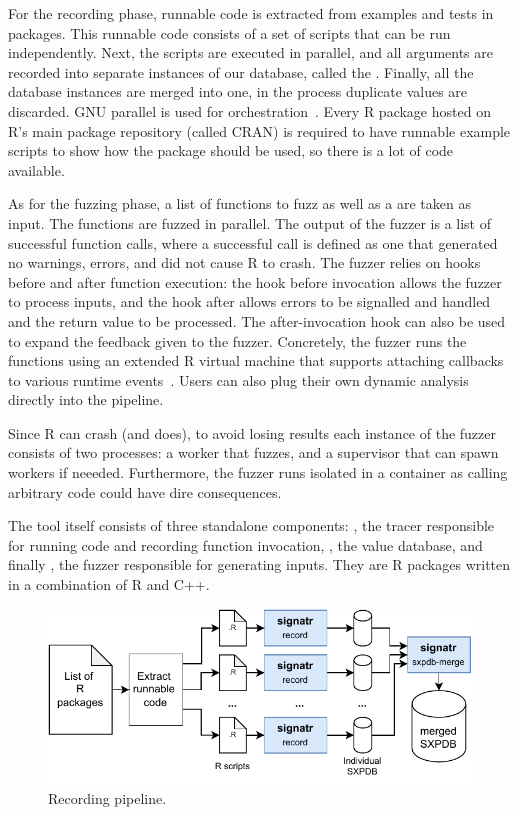 \documentclass[sigplan,nonacm,anonymous,review]{acmart}
\begin{document}
For the recording phase, runnable code is extracted from examples and tests in packages.  
This runnable code consists of a set of scripts
that can be run independently. Next, the scripts are
executed in parallel, and all arguments are recorded into separate instances of
our database, called the \sxpdb.  Finally, all the database instances
are merged into one, in the process duplicate values are discarded. 
GNU parallel is used for orchestration~\cite{tange2011_parallel}.
Every R package hosted on R's main package repository (called CRAN) 
is required to have runnable example scripts to show how the package 
should be used, so there is a lot of code available.

As for the fuzzing phase, a list of functions to fuzz as well as a
\sxpdb are taken as input. The functions are fuzzed in parallel.  The
output of the fuzzer is a list of successful function calls, where a
successful call is defined as one that generated no warnings, errors,
and did not cause R to crash.  The fuzzer relies on hooks before and
after function execution: the hook before invocation allows the fuzzer
to process inputs, and the hook after allows errors to be signalled
and handled and the return value to be processed.  The
after-invocation hook can also be used to expand the feedback given to
the fuzzer.  Concretely, the fuzzer runs the functions using an
extended R virtual machine that supports attaching callbacks to
various runtime events~\cite{goel2019}.  Users can also plug their own
dynamic analysis directly into the pipeline.

Since R can crash (and does), to avoid losing results each instance
of the fuzzer consists of two processes: a worker that fuzzes, and a
supervisor that can spawn workers if neeeded.  Furthermore, the fuzzer
runs isolated in a container as calling arbitrary code could have dire
consequences.

The tool itself consists of three standalone components: ,
the tracer responsible for running code and recording function
invocation, , the value database, and finally , the
fuzzer responsible for generating inputs. They are R
packages written in a combination of R and C++.

\begin{figure}
    \centering
    \includegraphics[width=\columnwidth]{code-and-figures/sxdb-pipeline.pdf}
    \caption{ Recording pipeline.  }\label{fig:sxpdb-pipeline}
\end{figure}
\end{document}
